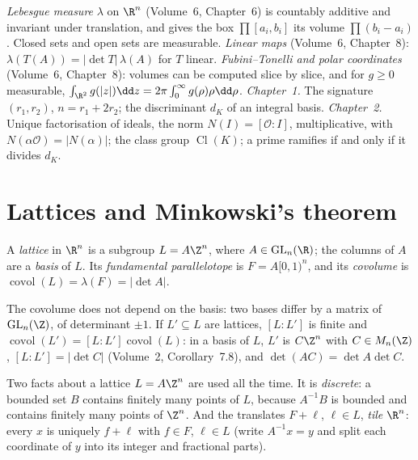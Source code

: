 \begin{reminder}
\emph{Lebesgue measure} $\lambda$ on $\R^n$ (Volume~6, Chapter~6) is countably additive and invariant under translation, and
gives the box $\prod[a_i,b_i]$ its volume $\prod(b_i-a_i)$. Closed sets and open sets are measurable. \emph{Linear maps}
(Volume~6, Chapter~8): $\lambda(T(A))=|\det T|\,\lambda(A)$ for $T$ linear. \emph{Fubini--Tonelli and polar coordinates}
(Volume~6, Chapter~8): volumes can be computed slice by slice, and for $g\ge0$ measurable,
$\int_{\R^2}g(|z|)\dd z=2\pi\int_0^\infty g(\rho)\rho\dd\rho$. \emph{Chapter~1.} The signature $(r_1,r_2)$, $n=r_1+2r_2$;
the discriminant $d_K$ of an integral basis. \emph{Chapter~2.} Unique factorisation of ideals, the norm
$N(I)=[\mathcal O:I]$, multiplicative, with $N(\alpha\mathcal O)=|N(\alpha)|$; the class group $\operatorname{Cl}(K)$;
a prime ramifies if and only if it divides $d_K$.
\end{reminder}

\section{Lattices and Minkowski's theorem}

\begin{definition}
A \emph{lattice} in $\R^n$ is a subgroup $L=A\Z^n$, where $A\in\mathrm{GL}_n(\R)$; the columns of $A$ are a
\emph{basis} of $L$. Its \emph{fundamental parallelotope} is $F=A[0,1)^n$, and its \emph{covolume} is
$\operatorname{covol}(L)=\lambda(F)=|\det A|$.
\end{definition}

The covolume does not depend on the basis: two bases differ by a matrix of $\mathrm{GL}_n(\Z)$, of determinant $\pm1$. If
$L'\subseteq L$ are lattices, $[L:L']$ is finite and $\operatorname{covol}(L')=[L:L']\operatorname{covol}(L)$: in a basis
of $L$, $L'$ is $C\Z^n$ with $C\in M_n(\Z)$, $[L:L']=|\det C|$ (Volume~2, Corollary~7.8), and $\det(AC)=\det A\det C$.

Two facts about a lattice $L=A\Z^n$ are used all the time. It is \emph{discrete}: a bounded set $B$ contains finitely
many points of $L$, because $A^{-1}B$ is bounded and contains finitely many points of $\Z^n$. And the translates $F+\ell$,
$\ell\in L$, \emph{tile} $\R^n$: every $x$ is uniquely $f+\ell$ with $f\in F$, $\ell\in L$ (write $A^{-1}x=y$ and split
each coordinate of $y$ into its integer and fractional parts).

